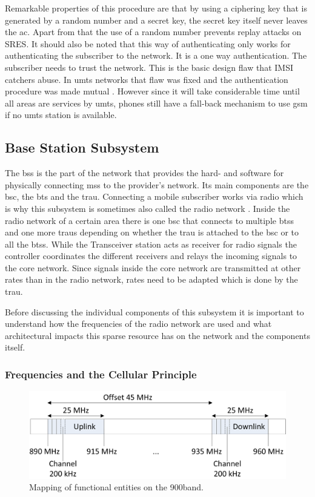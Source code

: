 Remarkable properties of this procedure are that by using a ciphering key that is generated by a random number and a secret key, the secret key itself never leaves the \gls{ac}.
Apart from that the use of a random number prevents replay attacks on SRES.
It should also be noted that this way of authenticating only works for authenticating the subscriber to the network.
It is a one way authentication.
The subscriber needs to trust the network.
This is the basic design flaw that IMSI catchers abuse.
In \gls{umts} networks that flaw was fixed and the authentication procedure was made mutual \cite{kommsys2006}.
However since it will take considerable time until all areas are services by \gls{umts}, phones still have a fall-back mechanism to use \gls{gsm} if no \gls{umts} station is available. 

\subsection{Base Station Subsystem}
\label{sec:bss}
The \gls{bss} is the part of the network that provides the hard- and software for physically connecting \glspl{ms} to the provider's network.
Its main components are the \gls{bsc}, the \gls{bts} and the \gls{trau}.
Connecting a mobile subscriber works via radio which is why this subsystem is sometimes also called the radio network \cite{kommsys2006}.
Inside the radio network of a certain area there is one \gls{bsc} that connects to multiple \glspl{bts} and one more \glspl{trau} depending on whether the \gls{trau} is attached to the \gls{bsc} or to all the \glspl{bts}.
While the Transceiver station acts as receiver for radio signals the controller coordinates the different receivers and relays the incoming signals  to the core network.
Since signals inside the core network are transmitted at other rates than in the radio network, rates need to be adapted which is done by the \gls{trau}.

Before discussing the individual components of this subsystem it is important to understand how the frequencies of the radio network are used and what architectural impacts this sparse resource has on the network and the components itself.

\subsubsection{Frequencies and the Cellular Principle}
\begin{figure}
\centering
\includegraphics{../Images/Mapping}
\caption{Mapping of functional entities on the 900\MHz band.}
\label{fig:frequency}
\end{figure}

